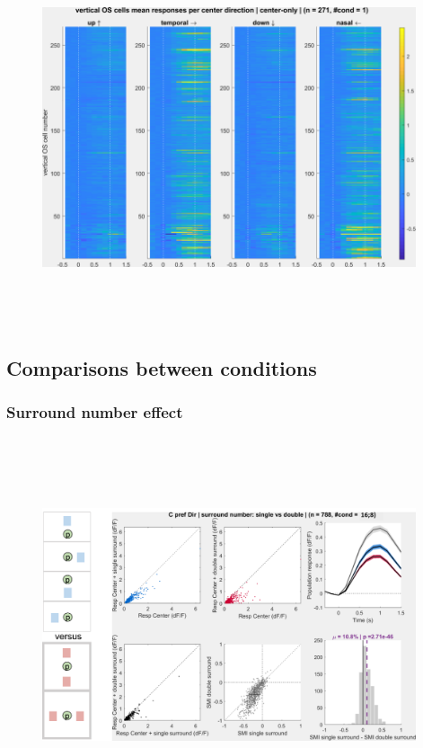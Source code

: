 \begin{figure}[H] \centering \includegraphics[width=11cm,height=11cm,keepaspectratio]{Figures/7.Results/population/sel/12_popPlots_vertOS_centerOnly.png} 
\end{figure}

\subsection{Comparisons between conditions}

\subsubsection{Surround number effect}

\begin{figure}[H] \centering \includegraphics[width=11cm,height=11cm,keepaspectratio]{Figures/7.Results/population/sel/diagrams/1.png} 
\end{figure}

